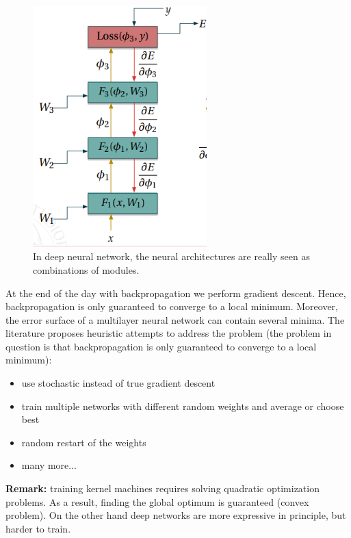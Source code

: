\begin{figure}
    \centering
    \includegraphics[width=0.6\textwidth]{images/deep_modules.png}
    \caption{In deep neural network, the neural architectures are really seen as combinations of modules.}
    \label{fig:deep_architectures:modular structure}
\end{figure}

At the end of the day with backpropagation we perform gradient descent. Hence, backpropagation is only guaranteed to converge to a local minimum. Moreover, the error surface of a multilayer neural network can contain several minima. The literature proposes heuristic attempts to address the problem (the problem in question is that backpropagation is only guaranteed to converge to a local minimum):
\begin{itemize}
    \item use stochastic instead of true gradient descent
    \item train multiple networks with different random weights and average or choose best
    \item random restart of the weights
    \item many more...
\end{itemize}

\textbf{Remark:} training kernel machines requires solving quadratic optimization problems. As a result, finding the global optimum is guaranteed (convex problem). On the other hand deep networks are more expressive in principle, but harder to train.

